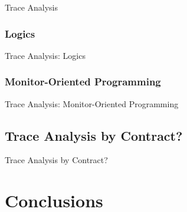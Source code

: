 \documentclass[12pt]{beamer}
\begin{document}
\begin{frame}{Trace Analysis}

\end{frame}

\subsubsection{Logics}
\label{sec:runver-trace-log}

\begin{frame}{Trace Analysis: Logics}

\end{frame}

\subsubsection{Monitor-Oriented Programming}
\label{sec:runver-trace-mop}

\begin{frame}{Trace Analysis: Monitor-Oriented Programming}

\end{frame}


\subsection{Trace Analysis by Contract?}
\label{sec:runver-tbc}

\begin{frame}{Trace Analysis by Contract?}
\end{frame}


\section{Conclusions}
\label{sec:conc}
\end{document}
